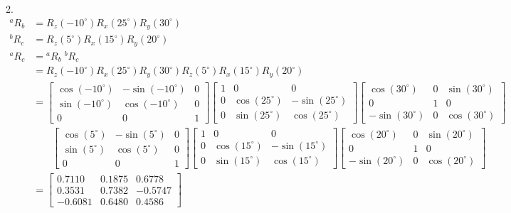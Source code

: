 \documentclass[UTF8, 12pt]{ctexart}
\begin{document}
2.
\[
\begin{aligned}
    {}^a R_b &= R_z(-10^\circ) R_x(25^\circ) R_y(30^\circ) \\
    {}^b R_c &= R_z(5^\circ) R_x(15^\circ) R_y(20^\circ) \\
    {}^a R_c &= {}^a R_b \; {}^b R_c \\
            &= R_z(-10^\circ) R_x(25^\circ) R_y(30^\circ) R_z(5^\circ) R_x(15^\circ) R_y(20^\circ) \\
            &= \begin{bmatrix}
                    \cos(-10^\circ) & -\sin(-10^\circ) & 0 \\
                    \sin(-10^\circ) &  \cos(-10^\circ) & 0 \\
                    0 & 0 & 1
                \end{bmatrix}
                \begin{bmatrix}
                    1 & 0 & 0 \\
                    0 & \cos(25^\circ) & -\sin(25^\circ) \\
                    0 & \sin(25^\circ) & \cos(25^\circ)
                \end{bmatrix}
                \begin{bmatrix}
                    \cos(30^\circ) & 0 & \sin(30^\circ) \\
                    0 & 1 & 0 \\
                    -\sin(30^\circ) & 0 & \cos(30^\circ)
                \end{bmatrix} \\[6pt]
                &\phantom{=} \;\;
                \begin{bmatrix}
                    \cos(5^\circ) & -\sin(5^\circ) & 0 \\
                    \sin(5^\circ) &  \cos(5^\circ) & 0 \\
                    0 & 0 & 1
                \end{bmatrix}
                \begin{bmatrix}
                    1 & 0 & 0 \\
                    0 & \cos(15^\circ) & -\sin(15^\circ) \\
                    0 & \sin(15^\circ) & \cos(15^\circ)
                \end{bmatrix}
                \begin{bmatrix}
                    \cos(20^\circ) & 0 & \sin(20^\circ) \\
                    0 & 1 & 0 \\
                    -\sin(20^\circ) & 0 & \cos(20^\circ)
                \end{bmatrix} \\
            &= \begin{bmatrix}
                    0.7110 & 0.1875 & 0.6778 \\
                    0.3531 & 0.7382 & -0.5747 \\
                    -0.6081 & 0.6480 & 0.4586
                \end{bmatrix}
\end{aligned}
\]
\vspace{1em}
\end{document}
